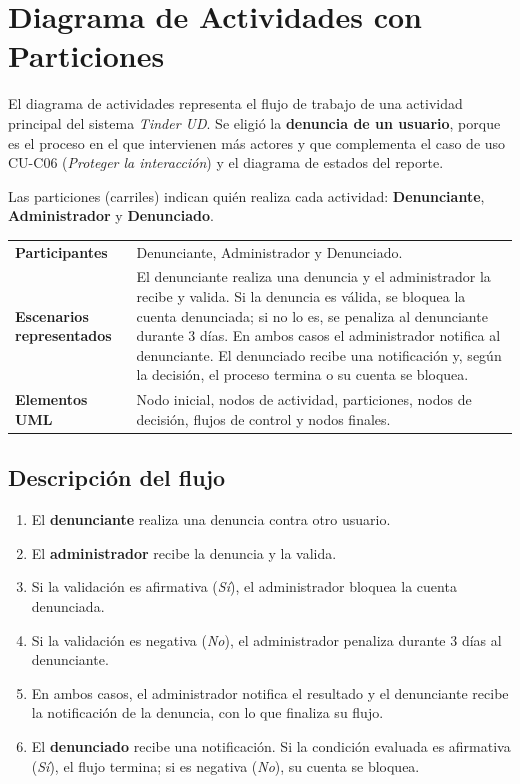 \documentclass[11pt,a4paper]{article}
\newcommand{\Ficha}[5]{
\begin{center}
\begin{tabularx}{\textwidth}{|l|X|}
\hline
\rowcolor{gray!25}
\multicolumn{2}{|c|}{\textbf{#1 -- #2}} \\
\hline
\textbf{Participantes} & #3 \\
\hline
\textbf{Escenarios representados} & #4 \\
\hline
\textbf{Elementos UML} & #5 \\
\hline
\end{tabularx}
\end{center}
}
\begin{document}
\section{Diagrama de Actividades con Particiones}

El diagrama de actividades representa el flujo de trabajo de una actividad
principal del sistema \textit{Tinder UD}. Se eligió la \textbf{denuncia de un
usuario}, porque es el proceso en el que intervienen más actores y que
complementa el caso de uso CU-C06 (\textit{Proteger la interacción}) y el
diagrama de estados del reporte.

Las particiones (carriles) indican quién realiza cada actividad:
\textbf{Denunciante}, \textbf{Administrador} y \textbf{Denunciado}.

\Ficha{AD-01}{Denuncia de un usuario}
{Denunciante, Administrador y Denunciado.}
{El denunciante realiza una denuncia y el administrador la recibe y valida. Si la denuncia es válida, se bloquea la cuenta denunciada; si no lo es, se penaliza al denunciante durante 3 días. En ambos casos el administrador notifica al denunciante. El denunciado recibe una notificación y, según la decisión, el proceso termina o su cuenta se bloquea.}
{Nodo inicial, nodos de actividad, particiones, nodos de decisión, flujos de control y nodos finales.}

\subsection{Descripción del flujo}

\begin{enumerate}
    \item El \textbf{denunciante} realiza una denuncia contra otro usuario.
    \item El \textbf{administrador} recibe la denuncia y la valida.
    \item Si la validación es afirmativa (\textit{Sí}), el administrador bloquea
    la cuenta denunciada.
    \item Si la validación es negativa (\textit{No}), el administrador penaliza
    durante 3 días al denunciante.
    \item En ambos casos, el administrador notifica el resultado y el
    denunciante recibe la notificación de la denuncia, con lo que finaliza su
    flujo.
    \item El \textbf{denunciado} recibe una notificación. Si la condición
    evaluada es afirmativa (\textit{Sí}), el flujo termina; si es negativa
    (\textit{No}), su cuenta se bloquea.
\end{enumerate}
\end{document}
